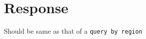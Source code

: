 \documentclass[a4paper, 10pt]{article}        %
\begin{document}
\section{Response}
Should be same as that of a \texttt{query by region} 

\end{document}
